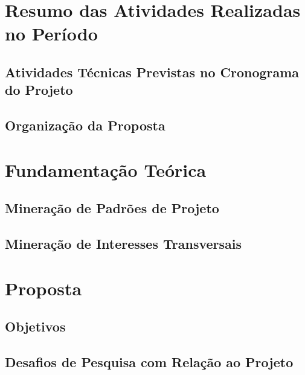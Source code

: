 \documentclass[a4paper,12pt]{article}
\begin{document}
\section{Resumo das Atividades Realizadas no Período}\label{atividades_realizadas}

	

	\subsection{Atividades Técnicas Previstas no Cronograma do Projeto}

		

	\subsection{Organização da Proposta}\label{org}

\section{Fundamentação Teórica}\label{sec:fundamentacao}


\subsection{Mineração de Padrões de Projeto}\label{sub:mineracao}


 
\subsection{Mineração de Interesses Transversais}\label{sub:mineracao}


\section{Proposta}\label{sec:proposta}


\subsection{Objetivos}\label{sec:Objetivos}


\subsection{Desafios de Pesquisa com Relação ao Projeto}\label{desafios}
\end{document}
